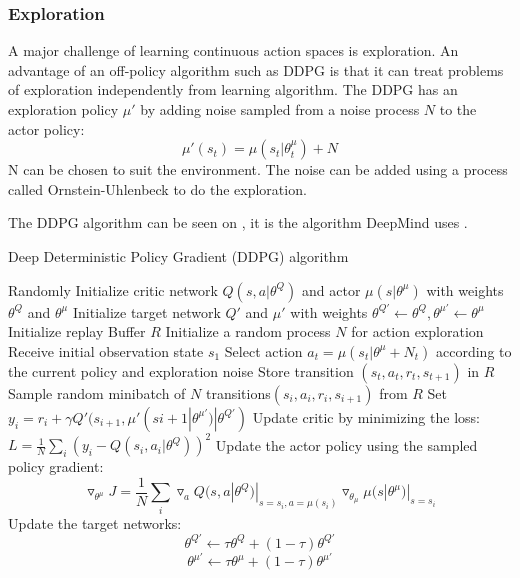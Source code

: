 \subsubsection{Exploration}
A major challenge of learning continuous action spaces is exploration. An advantage of an off-policy algorithm such as DDPG is that it can treat problems of exploration independently from learning algorithm. The DDPG has an exploration policy $\mu'$ by adding noise sampled from a noise process $N$ to the actor policy: 
\begin{equation}
\mu'(s_t) = \mu(s_t|\theta_t^\mu) + N
\end{equation} 
N can be chosen to suit the environment. The noise can be added using a process called Ornstein-Uhlenbeck to do the exploration.

The DDPG algorithm can be seen on , it is the algorithm DeepMind uses \cite{DBLP:journals/corr/LillicrapHPHETS15}.  



\begin{algorithm}[H]
	\caption{Deep Deterministic Policy Gradient (DDPG) algorithm}
	\label{algo:DDPG}
	\begin{algorithmic}[H]
		\State Randomly Initialize critic network $Q(s,a|\theta^Q)$ and actor $\mu(s|\theta^\mu)$ with weights $\theta^Q$ and $\theta^\mu$
		\State Initialize target network $Q'$ and $\mu'$ with weights $\theta^{Q'} \leftarrow \theta^{Q}, \theta^{\mu'} \leftarrow \theta^{\mu}$ 
		\State Initialize replay Buffer $R$
			\State Initialize a random process $N$ for action exploration
			\State Receive initial observation state $s_1$
				\State Select action $a_t = \mu(s_t|\theta^\mu + N_t)$ according to the current policy and exploration noise
				\State Store transition $(s_t,a_t,r_t,s_{t+1})$ in $R$
				\State Sample random minibatch of $N$ transitions$(s_i,a_i,r_i,s_{i+1})$ from $R$
				\State Set $y_i = r_i+\gamma Q'(s_{i+1},\mu'(s{i+1}|\theta^{\mu'})|\theta^{Q'})$
				\State Update critic by minimizing the loss: $L=\frac{1}{N} \sum_{i}(y_i - Q(s_i,a_i|\theta^Q))^2$
				\State Update the actor policy using the sampled policy gradient:   
		  			   \begin{equation*}
		  			   \triangledown_{\theta^\mu} J = \frac{1}{N} \sum_{i} \triangledown_{a}Q(s,a|\theta^Q)|_{s=s_i , a=\mu(s_i)} \triangledown_{\theta_\mu}\mu(s|\theta^\mu)|_{s=s_i} 
		  			   \end{equation*}
		  		\State Update the target networks:
		  			   \begin{equation*}
		  			   \theta^{Q'} \leftarrow \tau \theta^Q + (1-\tau)\theta^{Q'} 
		  			   \end{equation*}
		  			   \begin{equation*}
		  			   \theta^{\mu'} \leftarrow \tau \theta^\mu + (1-\tau)\theta^{\mu'} 
		  			   \end{equation*}
			\EndFor
		\EndFor
	\end{algorithmic}
\end{algorithm}


